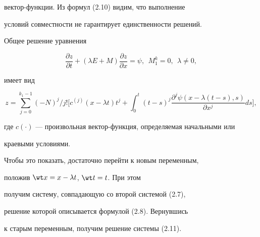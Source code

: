 вектор-функции. Из формул (2.10) видим, что выполнение


условий совместности не гарантирует единственности решений.





\begin{cors}


Общее решение уравнения


\begin{equation}


\frac{\partial z}{\partial t}+


(\lambda E+M)\frac{\partial z}{\partial x}=\psi ,\ \ M^k_1=0,\ \ 


\lambda \neq 0, 


\end{equation}


имеет вид 


$$


z=\sum \limits _{j=0}^{k_1-1}


(-N)^{j}/j!\bigg[c^{(j)}(x-\lambda t)t^{j}+


\int_{0}^t


(t-s)^j\frac{\partial ^j\psi (x-\lambda (t-s),s)}{\partial x^j}ds\bigg],


$$


где $c(\cdot)$ --- произвольная вектор-функция, определяемая начальными или 


краевыми условиями. 


Чтобы это показать, достаточно перейти к новым переменным, 


положив $\wt x=x-\lambda t$, $\wt t=t$. При этом 


получим систему, совпадающую со второй системой (2.7), 


решение которой описывается формулой (2.8). Вернувшись 


к старым переменным, получим решение системы (2.11). 


\end{cors}





